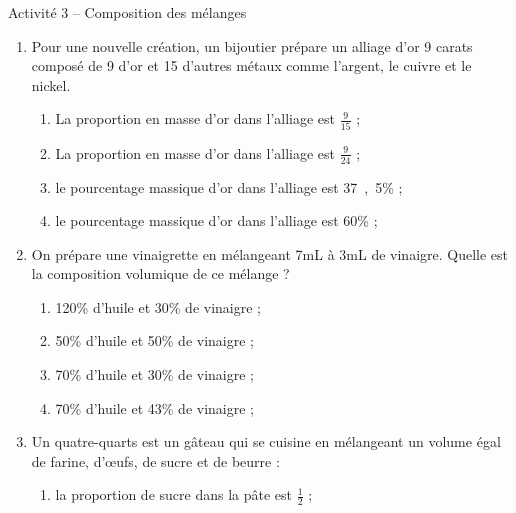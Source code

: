 
\cfoot{} %



\begin{header}
Activité 3 -- Composition des mélanges
\end{header}

\begin{enumerate}
\item Pour une nouvelle création, un bijoutier prépare un alliage d'or 9 carats composé de \unit{9}{\gram} d'or et \unit{15}{\gram} d'autres métaux comme l'argent, le cuivre et le nickel.
\begin{multicols}{2}
\begin{enumerate}
\item La proportion en masse d'or dans l'alliage est $\frac{9}{15}$ ;

\item La proportion en masse d'or dans l'alliage est $\frac{9}{24}$ ;

\item le pourcentage massique d'or dans l'alliage est \unit{37{,}5}{\%} ;

\item le pourcentage massique d'or dans l'alliage est \unit{60}{\%} ;
\end{enumerate}
\end{multicols}

\item On prépare une vinaigrette en mélangeant \unit{7}{mL} à \unit{3}{mL} de vinaigre.
Quelle est la composition volumique de ce mélange ?
\begin{multicols}{2}
\begin{enumerate}
\item \unit{120}{\%} d'huile et \unit{30}{\%} de vinaigre ;

\item \unit{50}{\%} d'huile et \unit{50}{\%} de vinaigre ;

\item \unit{70}{\%} d'huile et \unit{30}{\%} de vinaigre ;

\item \unit{70}{\%} d'huile et \unit{43}{\%} de vinaigre ;
\end{enumerate}
\end{multicols}

\item Un quatre-quarts est un gâteau qui se cuisine en mélangeant un volume égal de farine, d'œufs, de sucre et de beurre :
\begin{multicols}{2}
\begin{enumerate}
\item la proportion de sucre dans la pâte est $\frac{1}{2}$ ;


\end{enumerate}
\end{multicols}
\end{enumerate}
